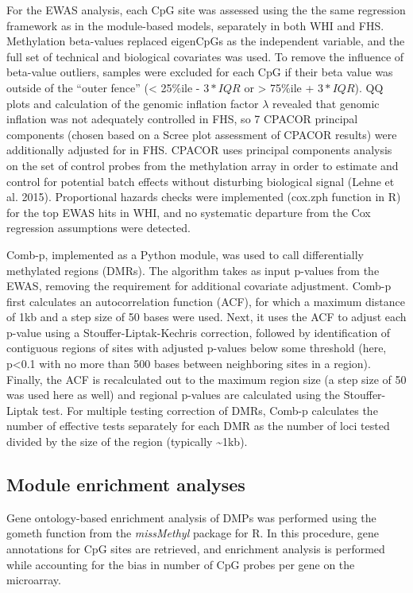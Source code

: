 \documentclass[]{article}
\theoremstyle{definition}
\theoremstyle{definition}
\theoremstyle{definition}
\theoremstyle{remark}
\begin{document}
For the EWAS analysis, each CpG site was assessed using the the same
regression framework as in the module-based models, separately in both
WHI and FHS. Methylation beta-values replaced eigenCpGs as the
independent variable, and the full set of technical and biological
covariates was used. To remove the influence of beta-value outliers,
samples were excluded for each CpG if their beta value was outside of
the ``outer fence'' (\textless{} 25\%ile - \(3*IQR\) or \textgreater{}
75\%ile + \(3*IQR\)). QQ plots and calculation of the genomic inflation
factor \(\lambda\) revealed that genomic inflation was not adequately
controlled in FHS, so 7 CPACOR principal components (chosen based on a
Scree plot assessment of CPACOR results) were additionally adjusted for
in FHS. CPACOR uses principal components analysis on the set of control
probes from the methylation array in order to estimate and control for
potential batch effects without disturbing biological signal (Lehne et
al. 2015). Proportional hazards checks were implemented (cox.zph
function in R) for the top EWAS hits in WHI, and no systematic departure
from the Cox regression assumptions were detected.

Comb-p, implemented as a Python module, was used to call differentially
methylated regions (DMRs). The algorithm takes as input p-values from
the EWAS, removing the requirement for additional covariate adjustment.
Comb-p first calculates an autocorrelation function (ACF), for which a
maximum distance of 1kb and a step size of 50 bases were used. Next, it
uses the ACF to adjust each p-value using a Stouffer-Liptak-Kechris
correction, followed by identification of contiguous regions of sites
with adjusted p-values below some threshold (here, p\textless{}0.1 with
no more than 500 bases between neighboring sites in a region). Finally,
the ACF is recalculated out to the maximum region size (a step size of
50 was used here as well) and regional p-values are calculated using the
Stouffer-Liptak test. For multiple testing correction of DMRs, Comb-p
calculates the number of effective tests separately for each DMR as the
number of loci tested divided by the size of the region (typically
\textasciitilde{}1kb).

\subsection{Module enrichment
analyses}\label{module-enrichment-analyses}

Gene ontology-based enrichment analysis of DMPs was performed using the
gometh function from the \emph{missMethyl} package for R. In this
procedure, gene annotations for CpG sites are retrieved, and enrichment
analysis is performed while accounting for the bias in number of CpG
probes per gene on the microarray.
\end{document}
